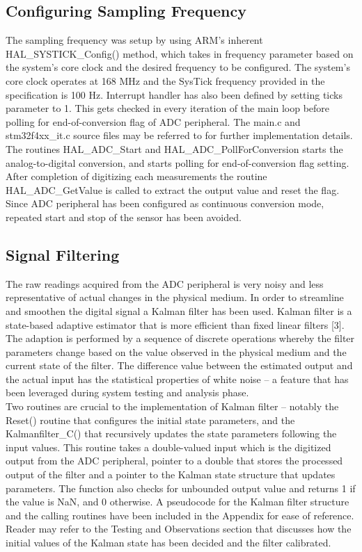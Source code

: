 \documentclass{article}
\begin{document}
\subsection{Configuring Sampling Frequency}
\noindent The sampling frequency was setup by using ARM’s inherent HAL\_SYSTICK\_Config() method, which takes in frequency parameter based on the system’s core clock and the desired frequency to be configured. The system’s core clock operates at 168 MHz and the SysTick frequency provided in the specification is 100 Hz. Interrupt handler has also been defined by setting ticks parameter to 1. This gets checked in every iteration of the main loop before polling for end-of-conversion flag of ADC peripheral. The main.c and stm32f4xx\_it.c source files may be referred to for further implementation details. \\

\noindent The routines HAL\_ADC\_Start and HAL\_ADC\_PollForConversion starts the analog-to-digital conversion, and starts polling for end-of-conversion flag setting. After completion of digitizing each measurements the routine HAL\_ADC\_GetValue is called to extract the output value and reset the flag. Since ADC peripheral has been configured as continuous conversion mode, repeated start and stop of the sensor has been avoided.

\subsection{Signal Filtering}
The raw readings acquired from the ADC peripheral is very noisy and less representative of actual changes in the physical medium. In order to streamline and smoothen the digital signal a Kalman filter has been used. Kalman filter is a state-based adaptive estimator that is more efficient than fixed linear filters [3]. The adaption is performed by a sequence of discrete operations whereby the filter parameters change based on the value observed in the physical medium and the current state of the filter. The difference value between the estimated output and the actual input has the statistical properties of white noise – a feature that has been leveraged during system testing and analysis phase.\\

\noindent Two routines are crucial to the implementation of Kalman filter – notably the Reset() routine that configures the initial state parameters, and the Kalmanfilter\_C() that recursively updates the state parameters following the input values. This routine takes a double-valued input which is the digitized output from the ADC peripheral, pointer to a double that stores the processed output of the filter and a pointer to the Kalman state structure that updates parameters. The function also checks for unbounded output value and returns 1 if the value is NaN, and 0 otherwise. A pseudocode for the Kalman filter structure and the calling routines have been included in the Appendix for ease of reference. Reader may refer to the Testing and Observations section that discusses how the initial values of the Kalman state has been decided and the filter calibrated.
\end{document}
